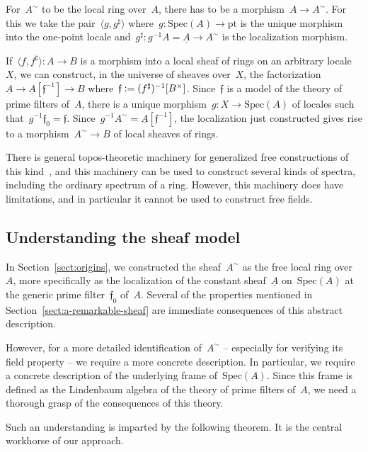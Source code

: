 \documentclass{ws-rv9x6}
\newcommand{\fff}{\mathfrak{f}}
\newcommand{\defeq}{\vcentcolon=}
\newcommand{\Spec}{\mathrm{Spec}}
\renewcommand{\_}{\mathpunct{.}}
\newcommand{\?}{\,{:}\,}
\newcommand{\pt}{\mathrm{pt}}
\begin{document}
For~$A^\sim$ to be the local ring over~$A$, there has to be a morphism~$A \to
A^\sim$. For this we take the pair~$\langle g, g^\sharp \rangle$ where~$g :
\Spec(A) \to \pt$ is the unique morphism into the one-point locale
and~$g^\sharp : g^{-1}A = \underline{A} \to A^\sim$ is the localization
morphism.

If~$\langle f,f^\sharp \rangle : A \to B$ is a morphism into a local sheaf of
rings on an arbitrary locale~$X$, we can construct, in the universe of sheaves
over~$X$, the factorization~$\underline{A} \to
\underline{A}[\fff^{-1}] \to B$ where~$\fff \defeq
(f^\sharp)^{-1}[B^\times]$. Since~$\fff$ is a model of the theory of prime
filters of~$A$, there is a unique morphism~$g : X \to \Spec(A)$ of locales such
that~$g^{-1}\fff_0 = \fff$. Since~$g^{-1}A^\sim = \underline{A}[\fff^{-1}]$,
the localization just constructed gives rise to a morphism~$A^\sim \to B$ of
local sheaves of rings.

\begin{remark}There is general topos-theoretic machinery for generalized free
constructions of this kind~\cite{coste:sheaf-representation,cole:spectra}, and
this machinery can be used to construct several kinds of spectra, including the
ordinary spectrum of a ring. However, this machinery does have limitations, and
in particular it cannot be used to construct free fields.
\end{remark}


\subsection{Understanding the sheaf model}
\label{sect:understanding}

In Section~\ref{sect:origins}, we constructed the sheaf~$A^\sim$ as the free
local ring over~$A$, more specifically as the localization of the constant
sheaf~$\underline{A}$ on~$\Spec(A)$ at the generic prime filter~$\fff_0$
of~$A$. Several of the properties mentioned in
Section~\ref{sect:a-remarkable-sheaf} are immediate consequences of this
abstract description.

However, for a more detailed identification of~$A^\sim$ -- especially for
verifying its field property -- we require a more concrete description. In
particular, we require a concrete description of the underlying frame
of~$\Spec(A)$. Since this frame is defined as the Lindenbaum algebra of the
theory of prime filters of~$A$, we need a thorough grasp of the consequences of
this theory.

Such an understanding is imparted by the following theorem. It is the
central workhorse of our approach.
\end{document}
